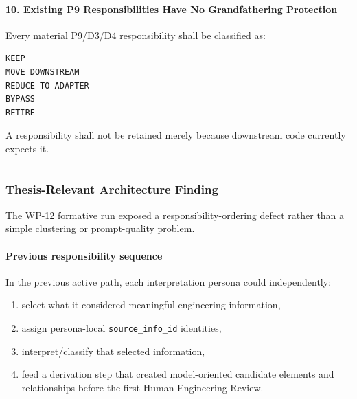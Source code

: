 \hypertarget{10-existing-p9-responsibilities-have-no-grandfathering-protection}{%
\paragraph{10. Existing P9 Responsibilities Have No Grandfathering Protection}\label{10-existing-p9-responsibilities-have-no-grandfathering-protection}}

Every material P9/D3/D4 responsibility shall be classified as:

\begin{verbatim}
KEEP
MOVE DOWNSTREAM
REDUCE TO ADAPTER
BYPASS
RETIRE
\end{verbatim}

A responsibility shall not be retained merely because downstream code currently expects it.

\begin{center}\rule{0.5\linewidth}{0.5pt}\end{center}

\hypertarget{thesis-relevant-architecture-finding}{%
\subsubsection{Thesis-Relevant Architecture Finding}\label{thesis-relevant-architecture-finding}}

The WP-12 formative run exposed a responsibility-ordering defect rather than a simple clustering or prompt-quality problem.

\hypertarget{previous-responsibility-sequence}{%
\paragraph{Previous responsibility sequence}\label{previous-responsibility-sequence}}

In the previous active path, each interpretation persona could independently:

\begin{enumerate}
\def\labelenumi{\arabic{enumi}.}
\tightlist
\item
  select what it considered meaningful engineering information,
\item
  assign persona-local \texttt{source\_info\_id} identities,
\item
  interpret/classify that selected information,
\item
  feed a derivation step that created model-oriented candidate elements and relationships before the first Human Engineering Review.
\end{enumerate}

